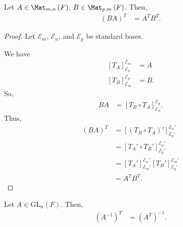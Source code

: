 \documentclass[10pt]{mypackage}
\begin{document}
\begin{lemma}
  Let $A\in \Mat_{m,n}\left(F\right)$, $B\in \Mat_{p,m}\left(F\right)$. Then,
  \begin{align*}
    \left(BA\right)^T &= A^TB^T.
  \end{align*}
\end{lemma}
\begin{proof}
  Let $\mathcal{E}_m$, $\mathcal{E}_n$, and $\mathcal{E}_p$ be standard bases.\newline

  We have
  \begin{align*}
    \left[T_A\right]_{\mathcal{E}_n}^{\mathcal{E}_m} &= A\\
    \left[T_B\right]_{\mathcal{E}_m}^{\mathcal{E}_p} &= B.
  \end{align*}
  So,
  \begin{align*}
    BA &= \left[T_B\circ T_A\right]_{\mathcal{E}_n}^{\mathcal{E}_p}.
  \end{align*}
  Thus,
  \begin{align*}
    \left(BA\right)^{T} &= \left[\left(T_B\circ T_A\right)'\right]_{\mathcal{E}_p'}^{\mathcal{E}_n'}\\
                        &= \left[T_A'\circ T_B'\right]_{\mathcal{E}_p'}^{\mathcal{E}_n'}\\
                        &= \left[T_A'\right]_{\mathcal{E}_m'}^{\mathcal{E}_n'}\left[T_{B}'\right]_{\mathcal{E}_p'}^{\mathcal{E}_m'}\\
                        &= A^TB^T.
  \end{align*}
\end{proof}
\begin{lemma}
  Let $A\in \text{GL}_{n}\left(F\right)$. Then,
  \begin{align*}
    \left(A^{-1}\right)^{T} &= \left(A^{T}\right)^{-1}.
  \end{align*}
\end{lemma}
\end{document}
